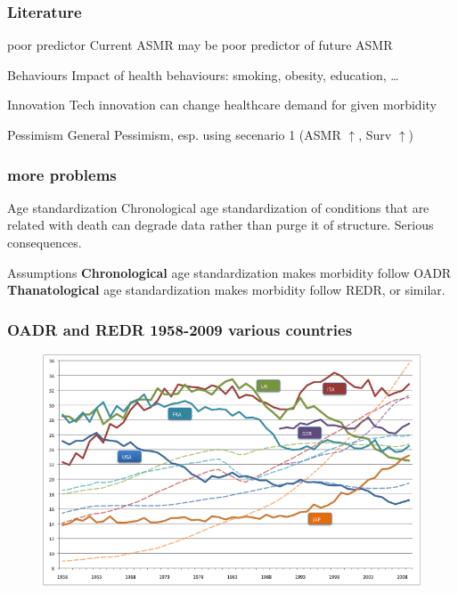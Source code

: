 \documentclass[20pt]{beamer}
\begin{document}
\begin{frame}%
\frametitle{Literature}

\begin{block}{poor predictor}
Current ASMR may be poor predictor of future ASMR
\end{block}

\begin{block}{Behaviours}
Impact of health behaviours: smoking, obesity, education, \ldots
\end{block}

\begin{block}{Innovation}
Tech innovation can change healthcare demand for given morbidity
\end{block}

\begin{block}{Pessimism}
General Pessimism, esp. using secenario 1 (ASMR $\uparrow$, Surv $\uparrow$)
\end{block}
\end{frame}	%
%
\begin{frame}
\frametitle{more problems}
\begin{block}{Age standardization}
Chronological age standardization of conditions that are related with death can
degrade data rather than purge it of structure. Serious consequences.
\end{block}
\begin{block}{Assumptions}
\textbf{Chronological} age standardization makes morbidity follow OADR
\textbf{Thanatological} age standardization makes morbidity follow REDR, or
similar.\footnotemark
\end{block}
%
\end{frame}

\begin{frame}
\frametitle{OADR and REDR 1958-2009 various countries}
\begin{figure}[b]
    \centering
    \includegraphics[scale=.9]{Figures/Johnsfig.png}
\end{figure} 
\end{frame}
\end{document}
